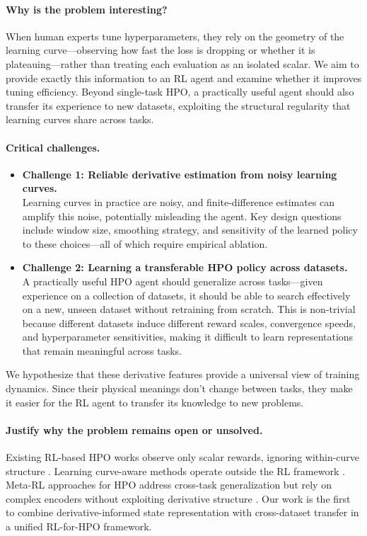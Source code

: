 \documentclass[12pt]{article}
\begin{document}
\paragraph{Why is the problem interesting?}
When human experts tune hyperparameters, they rely on the geometry of the learning curve---observing how fast the loss is dropping or whether it is plateauing---rather than treating each evaluation as an isolated scalar. We aim to provide exactly this information to an RL agent and examine whether it improves tuning efficiency. Beyond single-task HPO, a practically useful agent should also transfer its experience to new datasets, exploiting the structural regularity that learning curves share across tasks.

\paragraph{Critical challenges.}
\begin{itemize}
    \item \textbf{Challenge 1: Reliable derivative estimation from noisy learning curves.}\\
    Learning curves in practice are noisy, and finite-difference estimates can amplify this noise, potentially misleading the agent. Key design questions include window size, smoothing strategy, and sensitivity of the learned policy to these choices---all of which require empirical ablation.
    \item \textbf{Challenge 2: Learning a transferable HPO policy across datasets.}\\
    A practically useful HPO agent should generalize across tasks---given experience on a collection of datasets, it should be able to search effectively on a new, unseen dataset without retraining from scratch. This is non-trivial because different datasets induce different reward scales, convergence speeds, and hyperparameter sensitivities, making it difficult to learn representations that remain meaningful across tasks.
\end{itemize}
We hypothesize that these derivative features provide a universal view of training dynamics. Since their physical meanings don't change between tasks, they make it easier for the RL agent to transfer its knowledge to new problems.

\paragraph{Justify why the problem remains open or unsolved.}
Existing RL-based HPO works observe only scalar rewards, ignoring within-curve structure \citep{jomaa2019hyp}. Learning curve-aware methods operate outside the RL framework \citep{wistuba2022dyhpo}. Meta-RL approaches for HPO address cross-task generalization but rely on complex encoders without exploiting derivative structure \citep{albrechts2024model, wu2023hyperparameter}. Our work is the first to combine derivative-informed state representation with cross-dataset transfer in a unified RL-for-HPO framework.
\end{document}
